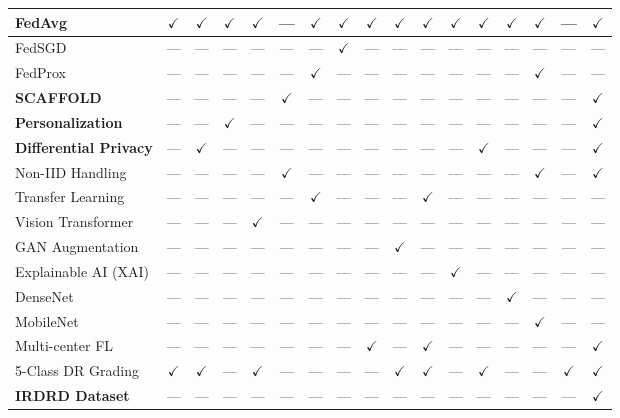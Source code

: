 \documentclass[12pt, a4paper]{article}
\begin{document}
\begin{landscape}
\begin{scriptsize}
\begin{longtable}{|l|*{15}{c|}c|}
FedAvg
  & $\checkmark$ & $\checkmark$ & $\checkmark$ & $\checkmark$ & --- & $\checkmark$ & $\checkmark$ & $\checkmark$ & $\checkmark$ & $\checkmark$ & $\checkmark$ & $\checkmark$ & $\checkmark$ & $\checkmark$ & --- & $\checkmark$ \\
\hline
FedSGD
  & --- & --- & --- & --- & --- & --- & $\checkmark$ & --- & --- & --- & --- & --- & --- & --- & --- & --- \\
\hline
FedProx
  & --- & --- & --- & --- & --- & $\checkmark$ & --- & --- & --- & --- & --- & --- & --- & $\checkmark$ & --- & --- \\
\hline
\textbf{SCAFFOLD}
  & --- & --- & --- & --- & $\checkmark$ & --- & --- & --- & --- & --- & --- & --- & --- & --- & --- & $\checkmark$ \\
\hline
\textbf{Personalization}
  & --- & --- & $\checkmark$ & --- & --- & --- & --- & --- & --- & --- & --- & --- & --- & --- & --- & $\checkmark$ \\
\hline
\textbf{Differential Privacy}
  & --- & $\checkmark$ & --- & --- & --- & --- & --- & --- & --- & --- & --- & $\checkmark$ & --- & --- & --- & $\checkmark$ \\
\hline
Non-IID Handling
  & --- & --- & --- & --- & $\checkmark$ & --- & --- & --- & --- & --- & --- & --- & --- & $\checkmark$ & --- & $\checkmark$ \\
\hline
Transfer Learning
  & --- & --- & --- & --- & --- & $\checkmark$ & --- & --- & --- & $\checkmark$ & --- & --- & --- & --- & --- & --- \\
\hline
Vision Transformer
  & --- & --- & --- & $\checkmark$ & --- & --- & --- & --- & --- & --- & --- & --- & --- & --- & --- & --- \\
\hline
GAN Augmentation
  & --- & --- & --- & --- & --- & --- & --- & --- & $\checkmark$ & --- & --- & --- & --- & --- & --- & --- \\
\hline
Explainable AI (XAI)
  & --- & --- & --- & --- & --- & --- & --- & --- & --- & --- & $\checkmark$ & --- & --- & --- & --- & --- \\
\hline
DenseNet
  & --- & --- & --- & --- & --- & --- & --- & --- & --- & --- & --- & --- & $\checkmark$ & --- & --- & --- \\
\hline
MobileNet
  & --- & --- & --- & --- & --- & --- & --- & --- & --- & --- & --- & --- & --- & $\checkmark$ & --- & --- \\
\hline
Multi-center FL
  & --- & --- & --- & --- & --- & --- & --- & $\checkmark$ & --- & $\checkmark$ & --- & --- & --- & --- & --- & $\checkmark$ \\
\hline
5-Class DR Grading
  & $\checkmark$ & $\checkmark$ & --- & $\checkmark$ & --- & --- & --- & --- & $\checkmark$ & $\checkmark$ & --- & $\checkmark$ & --- & --- & $\checkmark$ & $\checkmark$ \\
\hline
\textbf{IRDRD Dataset}
  & --- & --- & --- & --- & --- & --- & --- & --- & --- & --- & --- & --- & --- & --- & --- & $\checkmark$ \\
\hline
\end{longtable}
\end{scriptsize}
\end{landscape}
\end{document}
